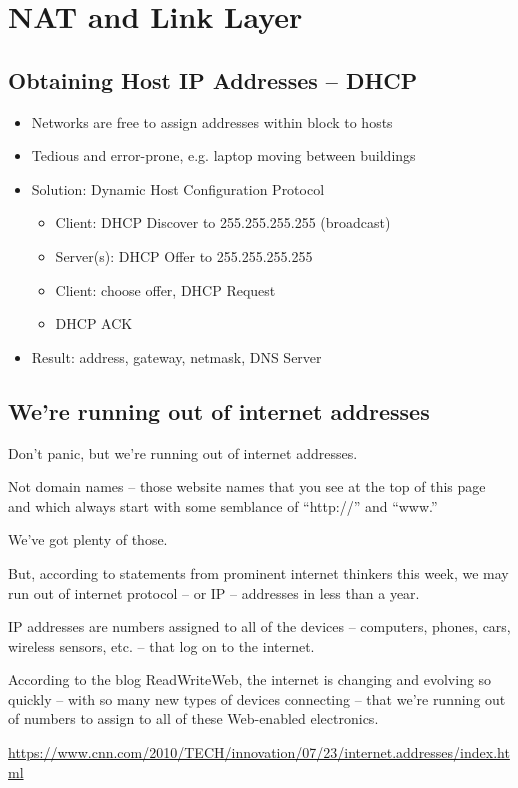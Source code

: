 \section{NAT and Link Layer}
\subsection{Obtaining Host IP Addresses -- DHCP}
\begin{itemize}
    \item Networks are free to assign addresses within block to hosts
    \item Tedious and error-prone, e.g. laptop moving between buildings
    \item Solution: Dynamic Host Configuration Protocol
          \begin{itemize}
              \item Client: DHCP Discover to 255.255.255.255 (broadcast)
              \item Server(s): DHCP Offer to 255.255.255.255
              \item Client: choose offer, DHCP Request
              \item DHCP ACK
          \end{itemize}
    \item Result: address, gateway, netmask, DNS Server
\end{itemize}

\subsection{We're running out of internet addresses}
\begin{tcolorbox}[colframe=red!40!white,colback=yellow!20,title=We're running out of internet addresses]
    Don't panic, but we're running out of internet addresses.

    Not domain names -- those website names that you see at the top of this page and which always start with some semblance of ``http://'' and ``www.''

    We've got plenty of those.

    But, according to statements from prominent internet thinkers this week, we may run out of internet protocol -- or IP -- addresses in less than a year.

    IP addresses are numbers assigned to all of the devices -- computers, phones, cars, wireless sensors, etc. -- that log on to the internet.

    According to the blog ReadWriteWeb, the internet is changing and evolving so quickly -- with so many new types of devices connecting -- that we're running out of numbers to assign to all of these Web-enabled electronics.

    \url{https://www.cnn.com/2010/TECH/innovation/07/23/internet.addresses/index.html}
\end{tcolorbox}
